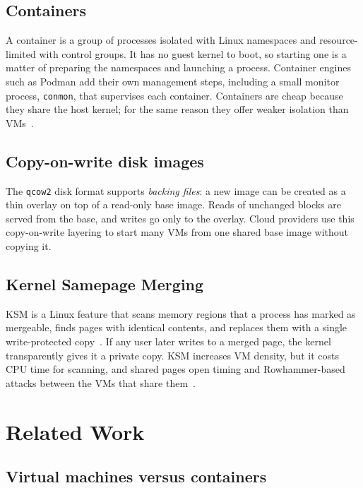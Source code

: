 \documentclass[pdflatex,sn-mathphys-num]{sn-jnl}%
\begin{document}
\subsection{Containers}

A container is a group of processes isolated with Linux namespaces and resource-limited with control groups. It has no guest kernel to boot, so starting one is a matter of preparing the namespaces and launching a process. Container engines such as Podman add their own management steps, including a small monitor process, \texttt{conmon}, that supervises each container. Containers are cheap because they share the host kernel; for the same reason they offer weaker isolation than VMs~\cite{manco2017lightvm,young2019gvisor}.

\subsection{Copy-on-write disk images}

The \texttt{qcow2} disk format supports \emph{backing files}: a new image can be created as a thin overlay on top of a read-only base image. Reads of unchanged blocks are served from the base, and writes go only to the overlay. Cloud providers use this copy-on-write layering to start many VMs from one shared base image without copying it.

\subsection{Kernel Samepage Merging}

KSM is a Linux feature that scans memory regions that a process has marked as mergeable, finds pages with identical contents, and replaces them with a single write-protected copy~\cite{arcangeli2009ksm,kernelksm}. If any user later writes to a merged page, the kernel transparently gives it a private copy. KSM increases VM density, but it costs CPU time for scanning, and shared pages open timing and Rowhammer-based attacks between the VMs that share them~\cite{suzaki2011dedup,razavi2016ffs}.

\section{Related Work}\label{sec:related}

\subsection{Virtual machines versus containers}
\end{document}
